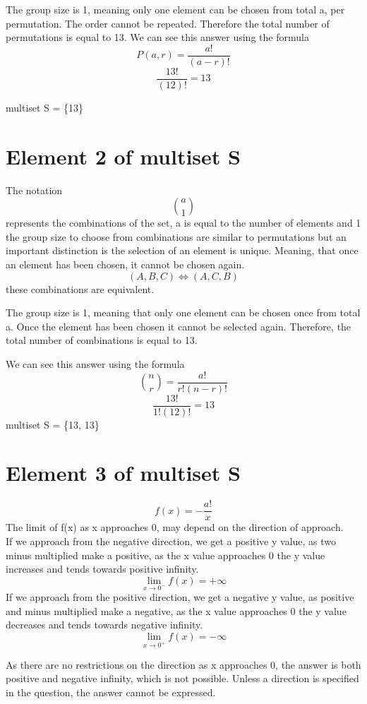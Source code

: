 \documentclass{article}
\begin{document}
\vspace{0.3cm}The group size is 1, meaning only one element can be chosen from total a, per permutation. The order cannot be repeated.
 Therefore the total number of permutations is equal to 13.
 We can see this answer using the formula \[
P(a, r) = \frac{a!}{(a - r)!}
\]
\[ \frac{13!}{(12)!} = 13
\]

multiset S = \{13\}
\vspace{0.3cm}\section*{Element 2 of multiset S}
The notation\[
\binom{a}{1} 
\]represents the combinations of the set, a is equal to the number of elements and 1 the group size to choose from combinations are similar to permutations but an important distinction is the selection of an element is unique. Meaning, that once an element has been chosen, it cannot be chosen again. 
\[
(A, B, C) \Leftrightarrow (A, C, B)
\] \vspace{0.3 cm}these combinations are equivalent.

The group size is 1, meaning that only one element can be chosen once from total a. Once the element has been chosen it cannot be selected again.
 Therefore, the total number of combinations is equal to 13.

\vspace{0.3 cm} We can see this answer using the formula\[
\binom{n}{r} = \frac{a!}{r!(n - r)!}
\]\[
\frac{13!}{1!(12)!} = 13
\]
multiset S = \{13, 13\}

\section{Element 3 of multiset S}
\[f(x) = - \frac{a!}{x}\]
The limit of f(x) as x approaches 0, may depend on the direction of approach. 
\\ If we approach from the negative direction, we get a positive y value, as two minus multiplied make a positive, as the x value approaches 0 the y value increases and tends towards positive infinity.\[
\lim_{x \to 0^-} f(x) = +\infty
\]
If we approach from the positive direction, we get a negative y value, as positive and minus multiplied make a negative, as the x value approaches 0 the y value decreases and tends towards negative infinity.\[
\lim_{x \to 0^+} f(x) = -\infty
\]

As there are no restrictions on the direction as x approaches 0, the answer is both positive and negative infinity, which is not possible. Unless a direction is specified in the question, the answer cannot be expressed.
\end{document}
